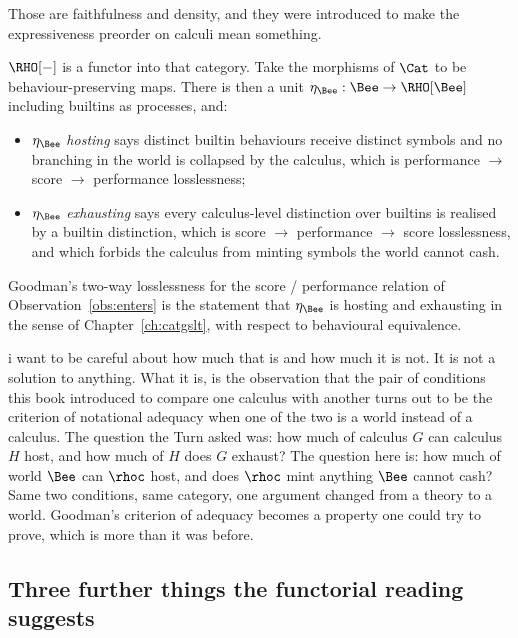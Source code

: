 \noindent
Those are faithfulness and density, and they were introduced to
make the expressiveness preorder on calculi mean something.

$\RHO[-]$ is a functor into that category.
Take the morphisms of $\Cat$ to be behaviour-preserving maps.
There is then a unit $\eta_{\Bee} : \Bee \to \RHO[\Bee]$ including
builtins as processes, and:

\begin{itemize}[leftmargin=1.6em]
\item $\eta_{\Bee}$ \emph{hosting} says distinct builtin behaviours
receive distinct symbols and no branching in the world is collapsed
by the calculus, which is performance $\to$ score $\to$ performance
losslessness;
\item $\eta_{\Bee}$ \emph{exhausting} says every calculus-level
distinction over builtins is realised by a builtin distinction,
which is score $\to$ performance $\to$ score losslessness, and
which forbids the calculus from minting symbols the world cannot
cash.
\end{itemize}

\begin{observation}
\label{obs:hosting}
Goodman's two-way losslessness for the score / performance relation
of Observation~\ref{obs:enters} is the statement that $\eta_{\Bee}$
is hosting and exhausting in the sense of
Chapter~\ref{ch:catgslt}, with respect to behavioural equivalence.
\end{observation}

\noindent
i want to be careful about how much that is and how much it is not.
It is not a solution to anything.
What it is, is the observation that the pair of conditions this
book introduced to compare one calculus with another turns out to
be the criterion of notational adequacy when one of the two is a
world instead of a calculus.
The question the Turn asked was: how much of calculus $G$ can
calculus $H$ host, and how much of $H$ does $G$ exhaust?
The question here is: how much of world $\Bee$ can $\rhoc$ host,
and does $\rhoc$ mint anything $\Bee$ cannot cash?
Same two conditions, same category, one argument changed from a
theory to a world.
Goodman's criterion of adequacy becomes a property one could try to
prove, which is more than it was before.

\subsection{Three further things the functorial reading suggests}
\label{sec:suggests}

